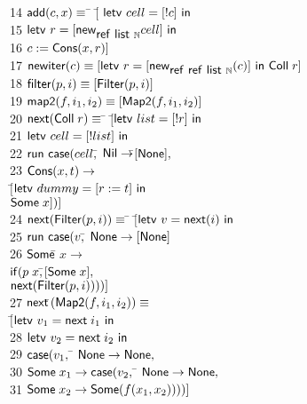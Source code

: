 \documentclass[preprint,natbib]{sigplanconf}
\begin{document}
{\begin{tabbing}
14 \> $\mbox{\textsf{{add}}}(c, x) \equiv$ \=
          $[$\= $\mbox{\textsf{{letv }}}cell = [!c]\mbox{\textsf{{ in }}}$ \\
15 \> \> \> $\mbox{\textsf{{letv }}}r = [\mbox{\textsf{{new}}}_{\mbox{\textsf{{ref }}}\mbox{\textsf{{list }}}{\mathbb{N}}} cell]\mbox{\textsf{{ in }}}$ \\
16 \> \> \> $c := \mbox{\textsf{{Cons}}}(x, r)]$
\\[0.5em]
17 \> $\mbox{\textsf{{new}}}\mbox{\textsf{{iter}}}(c) \equiv 
   [\mbox{\textsf{{letv }}}r = [\mbox{\textsf{{new}}}_{\mbox{\textsf{{ref }}}\mbox{\textsf{{ref }}}\mbox{\textsf{{list }}}{\mathbb{N}}} (c)]\mbox{\textsf{{ in }}}\mbox{\textsf{{Coll}}}\;r]$ 
\\[0.5em]
18 \> $\mbox{\textsf{{filter}}}(p, i) \equiv [\mbox{\textsf{{Filter}}}(p, i)]$ 
\\[0.5em]
19 \> $\mbox{\textsf{{map2}}}(f, i_1, i_2) \equiv [\mbox{\textsf{{Map2}}}(f, i_1, i_2)]$ 
\\[0.5em]
20 \> $\mbox{\textsf{{next}}}(\mbox{\textsf{{Coll}}}\;r) \equiv$ \=
       $[$\=$\mbox{\textsf{{letv }}}list = [!r]\mbox{\textsf{{ in }}}$ \\
21 \>\>\>$\mbox{\textsf{{letv }}}cell = [!list]\mbox{\textsf{{ in }}}$ \\
22 \>\> \>$\mbox{\textsf{{run }}}{}\mbox{\textsf{{case}}}(cell,$\=
            $\mbox{\textsf{{Nil}}} \to $\=$[\mbox{\textsf{{None}}}],$ \\
23 \>\>\>\> $\mbox{\textsf{{Cons}}}(x, t) \to $\\
   \>\>\>\>                   \> $[$\=$\mbox{\textsf{{letv }}}dummy = [r := t]\mbox{\textsf{{ in }}}$ \\
   \>\>\>\>                   \>    \>${\mbox{\textsf{{Some}}}\;x}])]$ \\
24 \> $\mbox{\textsf{{next}}}(\mbox{\textsf{{Filter}}}(p, i)) \equiv$ \= 
        $[$\=$\mbox{\textsf{{letv }}}v = \mbox{\textsf{{next}}}(i)\mbox{\textsf{{ in }}}$ \\
25 \>\>\>$\mbox{\textsf{{run }}}{}\mbox{\textsf{{case}}}(v,$\=
            $\mbox{\textsf{{None}}} \to [\mbox{\textsf{{None}}}]$ \\
26 \>\>\>\> $\mbox{\textsf{{Some}}}$\=$\;x \to $ \\
   \>\>\>\> \>$\mbox{\textsf{{if}}}(p\;x,$\=$[\mbox{\textsf{{Some}}}\; x],$ \\
   \>\>\>\> \>\>                                   $\mbox{\textsf{{next}}}(\mbox{\textsf{{Filter}}}(p, i))))]$
\\
27 \> $\mbox{\textsf{{next}}}$\=$(\mbox{\textsf{{Map2}}}(f, i_1, i_2)) \equiv$ \\
   \>\>$[$\=$\mbox{\textsf{{letv }}}v_1 = \mbox{\textsf{{next}}}\;i_1\mbox{\textsf{{ in }}}$ \\
28 \>\>\>$\mbox{\textsf{{letv }}}v_2 = \mbox{\textsf{{next}}}\;i_2\mbox{\textsf{{ in }}}$ \\
29 \>\>\>$\mbox{\textsf{{case}}}(v_1,$ \= 
            $\mbox{\textsf{{None}}} \to \mbox{\textsf{{None}}},$ \\
30 \>\>\>\> $\mbox{\textsf{{Some}}}\;x_1 \to \mbox{\textsf{{case}}}(v_2,$ \=
              $\mbox{\textsf{{None}}} \to \mbox{\textsf{{None}}},$ \\
31 \>\>\>\>\> $\mbox{\textsf{{Some}}}\;x_2 \to \mbox{\textsf{{Some}}}(f(x_1, x_2))))]$\\
\end{tabbing}
}
\end{document}
